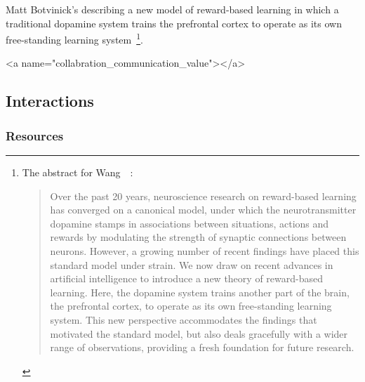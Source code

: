 Matt Botvinick's {} describing a new model of reward-based learning in which a traditional dopamine system trains the prefrontal cortex to operate as its own free-standing learning system~\cite{WangetalNATURE-NEUROSCIENCE-18}\footnote{%
%
  The abstract for Wang~\etal{}~\cite{WangetalNATURE-NEUROSCIENCE-18}:
%
  \begin{quotation}
%
   Over the past 20 years, neuroscience research on reward-based learning has converged on a canonical model, under which the neurotransmitter dopamine stamps in associations between situations, actions and rewards by modulating the strength of synaptic connections between neurons. However, a growing number of recent findings have placed this standard model under strain. We now draw on recent advances in artificial intelligence to introduce a new theory of reward-based learning. Here, the dopamine system trains another part of the brain, the prefrontal cortex, to operate as its own free-standing learning system. This new perspective accommodates the findings that motivated the standard model, but also deals gracefully with a wider range of observations, providing a fresh foundation for future research.
%
  \end{quotation}}.



\rawhtml
<a name="collabration_communication_value"></a>
\endrawhtml
\subsection*{Interactions}


\subsubsection*{Resources}


